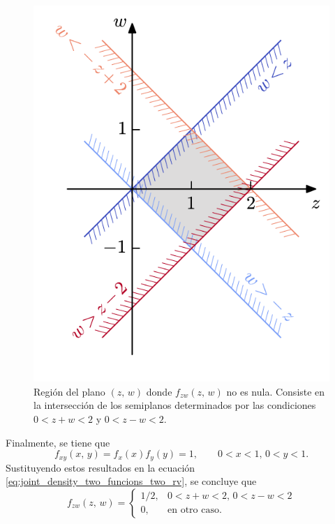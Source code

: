 \documentclass[a4paper]{report}
\begin{document}
\begin{figure}[!htb]
  \begin{minipage}[c]{0.35\textwidth}
    \includegraphics[width=\textwidth]{figuras/joint_distribution_sum_sub_v3.pdf}
  \end{minipage}\hfill
  \begin{minipage}[c]{0.62\textwidth}
    \caption{
       Región del plano \((z,\,w)\) donde \(f_{zw}(z,\,w)\) no es nula. Consiste en la intersección de los semiplanos determinados por las condiciones \(0<z+w<2\) y \(0<z-w<2\).
    } \label{fig:joint_distribution_sum_sub_v3}
  \end{minipage}
\end{figure}
Finalmente, se tiene que
\[
 f_{xy}(x,\,y)=f_x(x)f_y(y)=1,\qquad 0<x<1,\, 0<y<1.
\]
Sustituyendo estos resultados en la ecuación \ref{eq:joint_density_two_funcions_two_rv}, se concluye que
\[
 f_{zw}(z,\,w)=\left\{\begin{array}{ll}
  1/2, &  0<z+w<2,\,0<z-w<2\\
  0, & \textrm{en otro caso.}
 \end{array} \right.
\]
\end{document}
